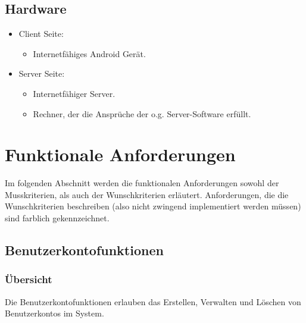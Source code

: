 \documentclass[parskip=full]{scrartcl}
\begin{document}
\subsection{Hardware}
\begin{itemize}
	\item Client Seite:
	\begin{itemize} 
		\item Internetfähiges Android Gerät.
	\end{itemize}
	
	\item Server Seite:
	\begin{itemize}
		\item Internetfähiger Server.
		\item Rechner, der die Ansprüche der o.g. Server-Software erfüllt.
	\end{itemize}		
\end{itemize}

\newpage

\section{Funktionale Anforderungen}
Im folgenden Abschnitt werden die funktionalen Anforderungen sowohl der Musskriterien, als auch der Wunschkriterien erläutert. Anforderungen, die die Wunschkriterien beschreiben (also nicht zwingend implementiert werden müssen) sind \colorbox{shadecolor}{farblich gekennzeichnet}.

\subsection{Benutzerkontofunktionen}

\subsubsection{Übersicht}
Die Benutzerkontofunktionen erlauben das Erstellen, Verwalten und Löschen von Benutzerkontos im System.
\end{document}

